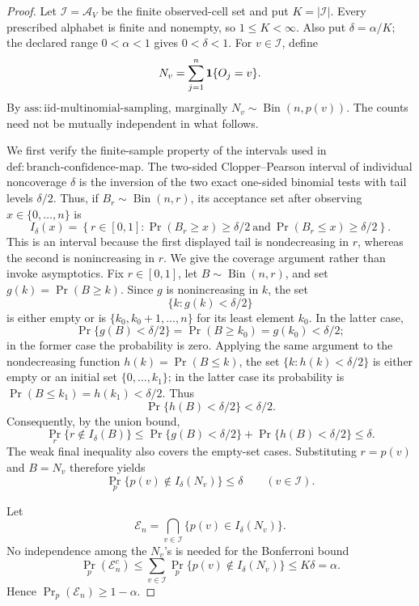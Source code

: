 \documentclass{article}
\begin{document}
\begin{proof}
Let \(\mathcal I=\mathcal A_V\) be the finite observed-cell set and put \(K=|\mathcal I|\).  Every prescribed alphabet is finite and nonempty, so \(1\leq K<\infty\).  Also put \(\delta=\alpha/K\); the declared range \(0<\alpha<1\) gives \(0<\delta<1\).  For \(v\in\mathcal I\), define
\[
 N_v=\sum_{j=1}^n {\bf 1}\{O_j=v\}.
\]
By \(\mathrm{ass:iid\text{-}multinomial\text{-}sampling}\), marginally \(N_v\sim\operatorname{Bin}(n,p(v))\).  The counts need not be mutually independent in what follows.

We first verify the finite-sample property of the intervals used in \(\mathrm{def:branch\text{-}confidence\text{-}map}\).  The two-sided Clopper--Pearson interval of individual noncoverage \(\delta\) is the inversion of the two exact one-sided binomial tests with tail levels \(\delta/2\).  Thus, if \(B_r\sim\operatorname{Bin}(n,r)\), its acceptance set after observing \(x\in\{0,\ldots,n\}\) is
\[
 I_\delta(x)
 =\left\{r\in[0,1]:
       \Pr(B_r\geq x)\geq\delta/2
       \ \text{and}\ 
       \Pr(B_r\leq x)\geq\delta/2
   \right\}.
\]
This is an interval because the first displayed tail is nondecreasing in \(r\), whereas the second is nonincreasing in \(r\).  We give the coverage argument rather than invoke asymptotics.  Fix \(r\in[0,1]\), let \(B\sim\operatorname{Bin}(n,r)\), and set \(g(k)=\Pr(B\geq k)\).  Since \(g\) is nonincreasing in \(k\), the set
\[
 \{k:g(k)<\delta/2\}
\]
is either empty or is \(\{k_0,k_0+1,\ldots,n\}\) for its least element \(k_0\).  In the latter case,
\[
 \Pr\{g(B)<\delta/2\}=\Pr(B\geq k_0)=g(k_0)<\delta/2;
\]
in the former case the probability is zero.  Applying the same argument to the nondecreasing function \(h(k)=\Pr(B\leq k)\), the set \(\{k:h(k)<\delta/2\}\) is either empty or an initial set \(\{0,\ldots,k_1\}\); in the latter case its probability is \(\Pr(B\leq k_1)=h(k_1)<\delta/2\).  Thus
\[
 \Pr\{h(B)<\delta/2\}<\delta/2.
\]
Consequently, by the union bound,
\[
 \Pr_r\{r\notin I_\delta(B)\}
 \leq
 \Pr\{g(B)<\delta/2\}+\Pr\{h(B)<\delta/2\}
 \leq\delta.
\]
The weak final inequality also covers the empty-set cases.  Substituting \(r=p(v)\) and \(B=N_v\) therefore yields
\[
 \Pr_p\{p(v)\notin I_\delta(N_v)\}\leq\delta
 \qquad(v\in\mathcal I).
\]

Let
\[
 \mathcal E_n=\bigcap_{v\in\mathcal I}
 \{p(v)\in I_\delta(N_v)\}.
\]
No independence among the \(N_v\)'s is needed for the Bonferroni bound
\[
 \Pr_p(\mathcal E_n^c)
 \leq\sum_{v\in\mathcal I}
       \Pr_p\{p(v)\notin I_\delta(N_v)\}
 \leq K\delta=\alpha.
\]
Hence \(\Pr_p(\mathcal E_n)\geq1-\alpha\).


\end{proof}
\end{document}
